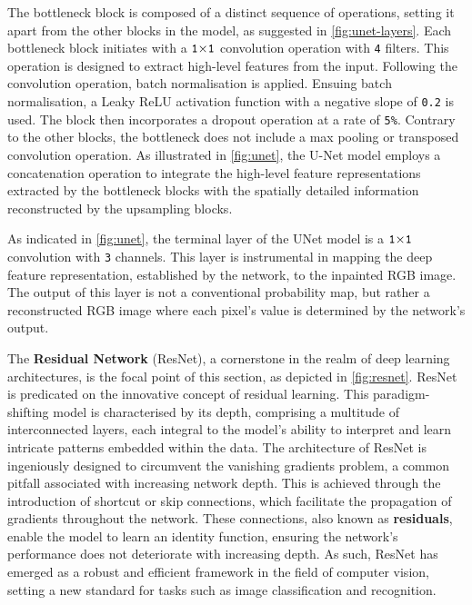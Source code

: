 The bottleneck block is composed of a distinct sequence of operations, setting it apart from the other blocks in the model, as suggested in \autoref{fig:unet-layers}. Each bottleneck block initiates with a $\text{\texttt{1}} {\times} \text{\texttt{1}}$ convolution operation with \texttt{4} filters. This operation is designed to extract high-level features from the input. Following the convolution operation, batch normalisation is applied. Ensuing batch normalisation, a Leaky ReLU activation function with a negative slope of \texttt{0.2} is used. The block then incorporates a dropout operation at a rate of \texttt{5\%}. Contrary to the other blocks, the bottleneck does not include a max pooling or transposed convolution operation. As illustrated in \autoref{fig:unet}, the U-Net model employs a concatenation operation to integrate the high-level feature representations extracted by the bottleneck blocks with the spatially detailed information reconstructed by the upsampling blocks.


As indicated in \autoref{fig:unet}, the terminal layer of the UNet model is a $\text{\texttt{1}} {\times} \text{\texttt{1}}$ convolution with \texttt{3} channels. This layer is instrumental in mapping the deep feature representation, established by the network, to the inpainted RGB image. The output of this layer is not a conventional probability map, but rather a reconstructed RGB image where each pixel's value is determined by the network's output.

\label{section:resnet}

The \textbf{Residual Network} (ResNet), a cornerstone in the realm of deep learning architectures, is the focal point of this section, as depicted in \autoref{fig:resnet}. ResNet is predicated on the innovative concept of residual learning. This paradigm-shifting model is characterised by its depth, comprising a multitude of interconnected layers, each integral to the model's ability to interpret and learn intricate patterns embedded within the data. The architecture of ResNet is ingeniously designed to circumvent the vanishing gradients problem, a common pitfall associated with increasing network depth. This is achieved through the introduction of shortcut or skip connections, which facilitate the propagation of gradients throughout the network. These connections, also known as \textbf{residuals}, enable the model to learn an identity function, ensuring the network's performance does not deteriorate with increasing depth. As such, ResNet has emerged as a robust and efficient framework in the field of computer vision, setting a new standard for tasks such as image classification and recognition.

